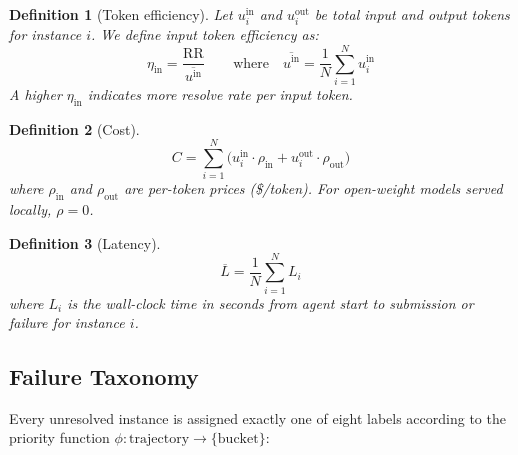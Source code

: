\documentclass[11pt]{article}
\newtheorem{definition}{Definition}
\begin{document}
\begin{definition}[Token efficiency]
Let $u_i^{\text{in}}$ and $u_i^{\text{out}}$ be total input and output tokens
for instance $i$.  We define \emph{input token efficiency} as:
\begin{equation}
  \eta_{\text{in}} = \frac{\text{RR}}{\,\overline{u^{\text{in}}}\,}
  \qquad \text{where} \quad
  \overline{u^{\text{in}}} = \frac{1}{N}\sum_{i=1}^{N} u_i^{\text{in}}
  \label{eq:token-efficiency}
\end{equation}
A higher $\eta_{\text{in}}$ indicates more resolve rate per input token.
\end{definition}

\begin{definition}[Cost]
\begin{equation}
  C = \sum_{i=1}^{N} \bigl( u_i^{\text{in}} \cdot \rho_{\text{in}}
                           + u_i^{\text{out}} \cdot \rho_{\text{out}} \bigr)
  \label{eq:cost}
\end{equation}
where $\rho_{\text{in}}$ and $\rho_{\text{out}}$ are per-token prices
(\$/token).  For open-weight models served locally, $\rho = 0$.
\end{definition}

\begin{definition}[Latency]
\begin{equation}
  \overline{L} = \frac{1}{N}\sum_{i=1}^{N} L_i
  \label{eq:latency}
\end{equation}
where $L_i$ is the wall-clock time in seconds from agent start to submission
or failure for instance $i$.
\end{definition}

\subsection{Failure Taxonomy}
\label{sec:taxonomy}

Every unresolved instance is assigned exactly one of eight labels according to
the priority function $\phi : \text{trajectory} \to \{\text{bucket}\}$:
\end{document}
